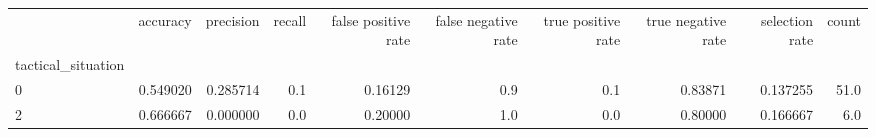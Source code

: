 \begin{tabular}{lrrrrrrrrr}
\toprule
{} &  accuracy &  precision &  recall &  false positive rate &  false negative rate &  true positive rate &  true negative rate &  selection rate &  count \\
tactical\_situation &           &            &         &                      &                      &                     &                     &                 &        \\
\midrule
0                  &  0.549020 &   0.285714 &     0.1 &              0.16129 &                  0.9 &                 0.1 &             0.83871 &        0.137255 &   51.0 \\
2                  &  0.666667 &   0.000000 &     0.0 &              0.20000 &                  1.0 &                 0.0 &             0.80000 &        0.166667 &    6.0 \\
\bottomrule
\end{tabular}
